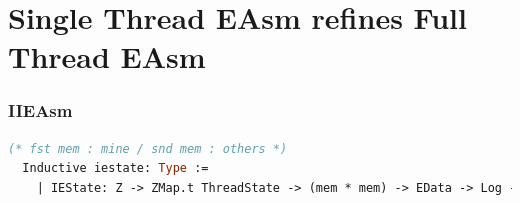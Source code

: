 

\section{Single Thread EAsm refines Full Thread EAsm}

\subsubsection{IIEAsm}
\begin{lstlisting}[language=Caml]
  (* fst mem : mine / snd mem : others *)
  Inductive iestate: Type :=
    | IEState: Z -> ZMap.t ThreadState -> (mem * mem) -> EData -> Log -> iestate.
\end{lstlisting}

